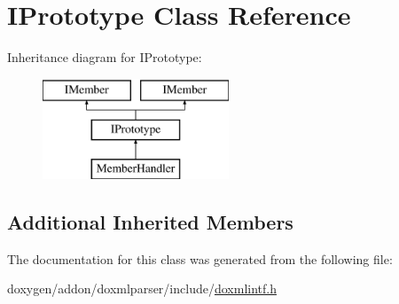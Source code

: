 \hypertarget{class_i_prototype}{}\section{I\+Prototype Class Reference}
\label{class_i_prototype}
Inheritance diagram for I\+Prototype\+:\begin{figure}[H]
\begin{center}
\leavevmode
\includegraphics[height=3.000000cm]{class_i_prototype}
\end{center}
\end{figure}
\subsection*{Additional Inherited Members}


The documentation for this class was generated from the following file\+:\begin{DoxyCompactItemize}
\item 
doxygen/addon/doxmlparser/include/\mbox{\hyperlink{include_2doxmlintf_8h}{doxmlintf.\+h}}\end{DoxyCompactItemize}
